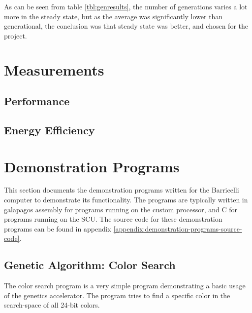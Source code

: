 As can be seen from table \ref{tbl:genresults}, the number of generations varies a lot more in the steady state, but as the average was significantly lower than generational, the conclusion was that steady state was better, and chosen for the project.


\section{Measurements}

\subsection{Performance}





\subsection{Energy Efficiency}


\section{Demonstration Programs}

This section documents the demonstration programs written for the Barricelli computer to demonstrate its functionality.
The programs are typically written in \gls{galapagos} assembly for programs running on the custom processor, and C for programs running on the \Gls{SCU}.
The source code for these demonstration programs can be found in appendix \vref{appendix:demonstration-programs-source-code}.

\subsection{Genetic Algorithm: Color Search}

The color search program is a very simple program demonstrating a basic usage of the genetics accelerator.
The program tries to find a specific color in the search-space of all 24-bit colors.

